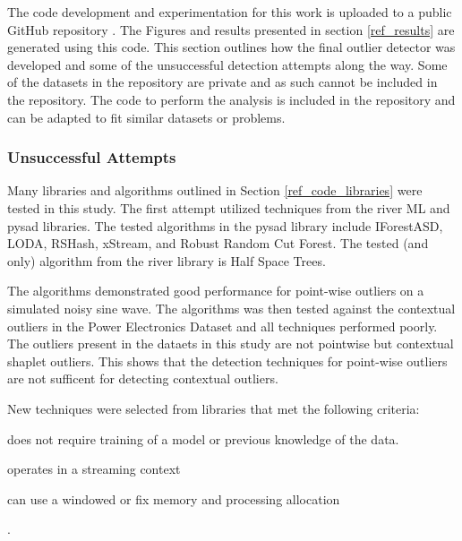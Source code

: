The code development and experimentation for this work is uploaded to a public GitHub repository \parencite{BeattieGithub2022}. The Figures and results presented in section \ref{ref_results} are generated using this code. This section outlines how the final outlier detector was developed and some of the unsuccessful detection attempts along the way. Some of the datasets in the repository are private and as such cannot be included in the repository. The code to perform the analysis is included in the repository and can be adapted to fit similar datasets or problems.

\subsubsection{Unsuccessful Attempts}

Many libraries and algorithms outlined in Section \ref{ref_code_libraries} were tested in this study. The first attempt utilized techniques from the river ML \parencite{2020river} and pysad \parencite{pysad} libraries. The tested algorithms in the pysad library include IForestASD, LODA, RSHash, xStream, and Robust Random Cut Forest. The tested (and only) algorithm from the river library is Half Space Trees.

The algorithms demonstrated good performance for point-wise outliers on a simulated noisy sine wave. The algorithms was then tested against the contextual outliers in the Power Electronics Dataset and all techniques performed poorly. The outliers present in the dataets in this study are not pointwise but contextual shaplet outliers.
This shows that the detection techniques for point-wise outliers are not sufficent for detecting contextual outliers.

New techniques were selected from libraries that met the following criteria:
\begin{inlinelist}
    \item does not require training of a model or previous knowledge of the data.
    \item operates in a streaming context
    \item can use a windowed or fix memory and processing allocation
\end{inlinelist}.

